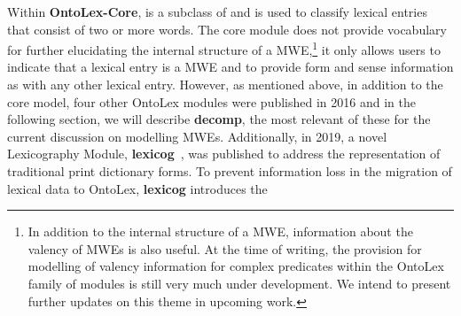 \documentclass[output=paper,colorlinks,citecolor=brown]{langscibook}
\begin{document}
Within \textbf{OntoLex-Core},  
is a subclass of  and is used to classify lexical entries that consist of two or more words. The core module does not provide vocabulary for further elucidating the internal structure of a MWE,\footnote{In addition to the internal structure of a MWE, information about the valency of MWEs is also useful. At the time of writing, the provision for modelling of valency information for complex predicates within the OntoLex family of modules is still very much under development. We intend to present further updates on this theme in upcoming work.} it only allows users to indicate that a lexical entry is a MWE and to provide form and sense information as with any other lexical entry.
However, as mentioned above, in addition to the core model, four other OntoLex modules were published in 2016 and in the following section, we will describe \textbf{decomp}, the most relevant of these for the current discussion on modelling MWEs.
Additionally, in 2019, a novel Lexicography Module, \textbf{lexicog}~\citep{lexicog-2019}, was published
to address the representation of traditional print dictionary forms. To prevent information loss in the migration of lexical data to OntoLex, \textbf{lexicog} introduces the
\end{document}
